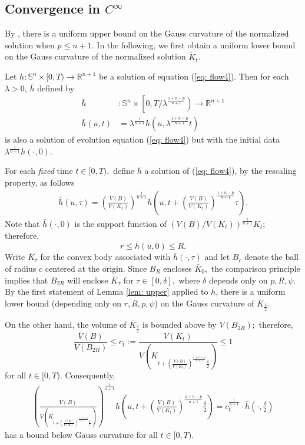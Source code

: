 \documentclass{amsart}
\theoremstyle{definition}
\theoremstyle{remark}
\numberwithin{equation}{section}
\begin{document}
\subsection{Convergence in $C^{\infty}$}

By \cite[Lemma 9.2]{Ivaki 2014-gauss}, there is a uniform upper bound on the Gauss curvature of the normalized solution when $p\leq n+1.$
In the following, we first obtain a uniform lower bound on the Gauss curvature of the normalized solution $\tilde{K}_t$.


Let $h:\mathbb{S}^{n}\times[0,T)\to\mathbb{R}^{n+1}$ be a solution of equation (\ref{eq: flow4}). Then for each $\lambda >0$, $\bar{h}$ defined by
\begin{align*}
\bar{h}&:\mathbb{S}^{n}\times\left[0,T/\lambda^{\frac{1+n-p}{n+1}}\right)\to\mathbb{R}^{n+1}\\
\bar{h}(u,t)&=\lambda^{\frac{1}{n+1}} h\left(u,\lambda^{\frac{1+n-p}{n+1}}t\right)
\end{align*}
is also a solution of evolution equation (\ref{eq: flow4}) but with the initial data $\lambda^{\frac{1}{n+1}} h\left(\cdot,0\right).$

For each \emph{fixed} time $t\in[0,T),$ define $\bar{h}$ a solution of (\ref{eq: flow4}), by the rescaling property, as follows
\begin{align*}
\bar{h}(u,\tau)=\left(\frac{V(B)}{V(K_t)}\right)^{\frac{1}{n+1}}h\left(u,
t+\left(\frac{V(B)}{V(K_t)}\right)^{\frac{1+n-p}{n+1}}\tau\right).
\end{align*}
Note that $\bar{h}(\cdot,0)$ is the support function of $\left(V(B)/V(K_t)\right)^{\frac{1}{n+1}}K_t$; therefore,
\[r\leq \bar{h}(u,0)\leq R.\]
Write $\bar{K}_{\tau}$ for the convex body associated with $\bar{h}(\cdot,\tau)$ and let $B_c$ denote the ball of radius $c$ centered at the origin. Since $B_{R}$ encloses
$\bar{K}_0,$ the comparison principle implies that $B_{2R}$
will enclose $\bar{K}_{\tau}$ for $\tau\in[0,\delta],$
where $\delta$ depends only on $p,R,\psi$. By the first statement of Lemma \ref{lem: upper} applied to $\bar{h}$, there is a uniform lower bound (depending only on $r,R,p,\psi$) on the Gauss curvature of $\bar{K}_{\frac{\delta}{2}}.$

On the other hand, the volume of $\bar{K}_{\frac{\delta}{2}}$ is bounded above by $V(B_{2R});$ therefore,
\[\displaystyle\frac{V(B)}{V(B_{2R})}\leq c_t:=\frac{V(K_t)}{V\left(K_{t+\left(\frac{V(B)}{V(K_t)}\right)^{\frac{1+n-p}{n+1}}\frac{\delta}{2}}\right)}\leq 1\]
for all $t\in [0,T)$. Consequently,
\begin{align*}
\left(\frac{V(B)}{V\left(K_{t+\left(\frac{V(B)}{V(K_t)}\right)^{\frac{1+n-p}{n+1}}\frac{\delta}{2}}\right)}\right)^{\frac{1}{n+1}}h\left(u,
t+\left(\frac{V(B)}{V(K_t)}\right)^{\frac{1+n-p}{n+1}}\frac{\delta}{2}\right)
=c_t^{\frac{1}{n+1}}\cdot\bar{h}(\cdot,\frac{\delta}{2})
\end{align*}
has a bound below Gauss curvature for all $t\in [0,T)$.
\end{document}
